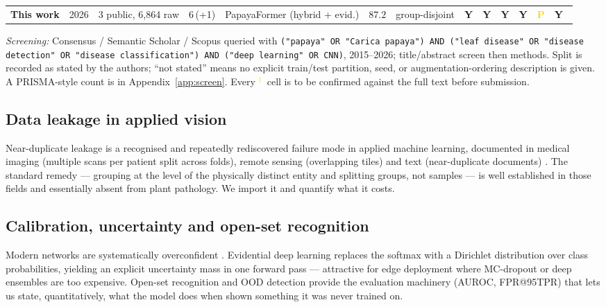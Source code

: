 \documentclass[10pt,twocolumn,a4paper]{article}
\newcommand{\VER}{\textcolor{gold}{$^{\dagger}$}}
\newcommand{\cmark}{\textcolor{leafgreen}{\textbf{Y}}}
\newcommand{\pmark}{\textcolor{gold}{\textbf{P}}}
\begin{document}
\begin{table}[t]
{\begin{tabularx}{\textwidth}{@{}p{2.05cm} p{0.4cm} p{1.95cm} p{0.36cm} X p{0.66cm} p{1.7cm} p{0.5cm} p{0.5cm} p{0.5cm} p{0.44cm} p{0.5cm} p{0.42cm}@{}}
\midrule
\rowcolor{boxbg}
\textbf{This work} & 2026 & 3 public, 6{,}864 raw & 6\,(+1) & PapayaFormer (hybrid + evid.) & $87.2$ & group-disjoint & \cmark & \cmark & \cmark & \cmark & \pmark & \cmark \
\bottomrule
\end{tabularx}}
\vspace{2pt}
{\scriptsize \textit{Screening:} Consensus / Semantic Scholar / Scopus queried with \texttt{("papaya" OR "Carica papaya") AND ("leaf disease" OR "disease detection" OR "disease classification") AND ("deep learning" OR CNN)}, 2015--2026; title/abstract screen then methods. Split is recorded as stated by the authors; ``not stated'' means no explicit train/test partition, seed, or augmentation-ordering description is given. A PRISMA-style count is in Appendix~\ref{app:screen}. Every \VER\ cell is to be confirmed against the full text before submission.}
\end{table}

\subsection{Data leakage in applied vision}
Near-duplicate leakage is a recognised and repeatedly rediscovered failure mode in applied machine learning, documented in medical imaging (multiple scans per patient split across folds), remote sensing (overlapping tiles) and text (near-duplicate documents) \cite{leakage_med,leakage_general}. The standard remedy --- grouping at the level of the physically distinct entity and splitting groups, not samples --- is well established in those fields and essentially absent from plant pathology. We import it and quantify what it costs.

\subsection{Calibration, uncertainty and open-set recognition}
Modern networks are systematically overconfident \cite{guo2017}. Evidential deep learning \cite{sensoy2018} replaces the softmax with a Dirichlet distribution over class probabilities, yielding an explicit uncertainty mass in one forward pass --- attractive for edge deployment where MC-dropout or deep ensembles are too expensive. Open-set recognition and OOD detection provide the evaluation machinery (AUROC, FPR@95TPR) that lets us state, quantitatively, what the model does when shown something it was never trained on.
\end{document}
